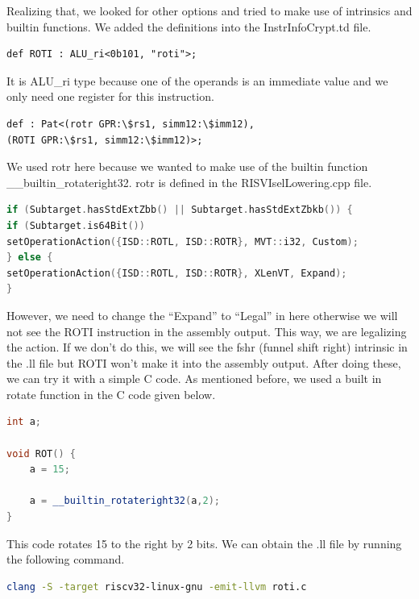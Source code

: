 Realizing that, we looked for other options and tried to make use of intrinsics and builtin functions. We added the definitions into the InstrInfoCrypt.td file.

\begin{lstlisting}
def ROTI : ALU_ri<0b101, "roti">;
\end{lstlisting}

It is ALU\_ri type because one of the operands is an immediate value and we only need one register for this instruction.

\begin{lstlisting}
def : Pat<(rotr GPR:\$rs1, simm12:\$imm12),
(ROTI GPR:\$rs1, simm12:\$imm12)>;
\end{lstlisting}

We used rotr here because we wanted to make use of the builtin function \_\_builtin\_rotateright32. rotr is defined in the RISVIselLowering.cpp file.

\begin{lstlisting}[language=C++]
if (Subtarget.hasStdExtZbb() || Subtarget.hasStdExtZbkb()) {
if (Subtarget.is64Bit())
setOperationAction({ISD::ROTL, ISD::ROTR}, MVT::i32, Custom);
} else {
setOperationAction({ISD::ROTL, ISD::ROTR}, XLenVT, Expand); 
}
\end{lstlisting}

However, we need to change the “Expand” to “Legal” in here otherwise we will not see the ROTI instruction in the assembly output.  This way, we are legalizing the action. If we don’t do this, we will see the fshr (funnel shift right) intrinsic in the .ll file but ROTI won’t make it into the assembly output. After doing these, we can try it with a simple C code. As mentioned before, we used a built in rotate function in the C code given below. 

\begin{lstlisting}[language=C++]
int a;

void ROT() {
	a = 15;
	
	a = __builtin_rotateright32(a,2);	
}
\end{lstlisting}

This code rotates 15 to the right by 2 bits. We can obtain the .ll file by running the following command.

\begin{lstlisting}[language=Bash]
clang -S -target riscv32-linux-gnu -emit-llvm roti.c
\end{lstlisting}

